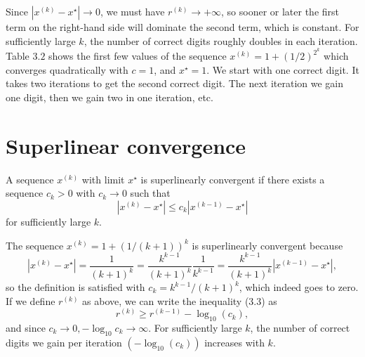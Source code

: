 Since $ \left|x^{(k)}-x^{\star}\right| \rightarrow 0 $, we must have $ r^{(k)} \rightarrow+\infty $, so sooner or later the first term on the right-hand side will dominate the second term, which is constant. For sufficiently large $ k $, the number of correct digits roughly doubles in each iteration.
Table $ 3.2 $ shows the first few values of the sequence $ x^{(k)}=1+(1 / 2)^{2^{k}} $ which converges quadratically with $ c=1 $, and $ x^{\star}=1 $. We start with one correct digit. It takes two iterations to get the second correct digit. The next iteration we gain one digit, then we gain two in one iteration, etc.

\section{Superlinear convergence}

A sequence $ x^{(k)} $ with limit $ x^{\star} $ is superlinearly convergent if there exists a sequence $ c_{k}>0 $ with $ c_{k} \rightarrow 0 $ such that
\begin{equation}
\left|x^{(k)}-x^{\star}\right| \leq c_{k}\left|x^{(k-1)}-x^{\star}\right|
\end{equation}
for sufficiently large $ k $.

The sequence $ x^{(k)}=1+(1 /(k+1))^{k} $ is superlinearly convergent because
\begin{equation}
\left|x^{(k)}-x^{\star}\right|=\frac{1}{(k+1)^{k}}=\frac{k^{k-1}}{(k+1)^{k}} \frac{1}{k^{k-1}}=\frac{k^{k-1}}{(k+1)^{k}}\left|x^{(k-1)}-x^{\star}\right|,
\end{equation}
so the definition is satisfied with $ c_{k}=k^{k-1} /(k+1)^{k} $, which indeed goes to zero.
If we define $ r^{(k)} $ as above, we can write the inequality (3.3) as
\begin{equation}
r^{(k)} \geq r^{(k-1)}-\log _{10}\left(c_{k}\right),
\end{equation}
and since $ c_{k} \rightarrow 0,-\log _{10} c_{k} \rightarrow \infty $. For sufficiently large $ k $, the number of correct digits we gain per iteration $ \left(-\log _{10}\left(c_{k}\right)\right) $ increases with $ k $.

